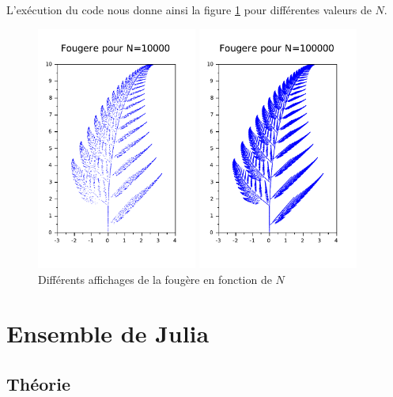 \documentclass[a4paper,10pt]{report}
\begin{document}
L'exécution du code nous donne ainsi la figure \ref{affichage_fougere} pour différentes valeurs de $N$.
\begin{figure}[H]
\caption{Différents affichages de la fougère en fonction de $N$}
   \begin{minipage}[c]{.49\linewidth}
   \centering
      \includegraphics[height=8cm]{graphfougere.pdf}
   \end{minipage} \hfill
   \begin{minipage}[c]{.49\linewidth}
   \centering
      \includegraphics[height=8cm]{graphfougere_2.pdf}
   \end{minipage}
\label{affichage_fougere}
\end{figure}

\section{Ensemble de Julia}

\subsection{Théorie}
\end{document}
